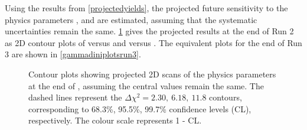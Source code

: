 
Using the results from \tab\ref{projectedyields}, the projected future sensitivity to the physics parameters \rb, \deltab and \Pgamma are estimated, assuming that the systematic uncertainties remain the same. \Fig\ref{gammadiniplotsrun2} gives the projected results at the end of Run 2 as 2D contour plots of \rb versus \Pgamma and \deltab versus \Pgamma. The equivalent plots for the end of Run 3 are shown in \fig\ref{gammadiniplotsrun3}. 

\begin{figure}[h]
\centering
{}
\caption{Contour plots showing projected 2D scans of the physics parameters at the end of \runtwo, assuming the central values remain the same. The dashed lines represent the $\Delta \chi^2 = 2.30,\ 6.18,\ 11.8$ contours, corresponding to 68.3\%, 95.5\%, 99.7\% confidence levels (CL), respectively. The colour scale represents 1 - CL.}
\label{gammadiniplotsrun2}
\end{figure}

